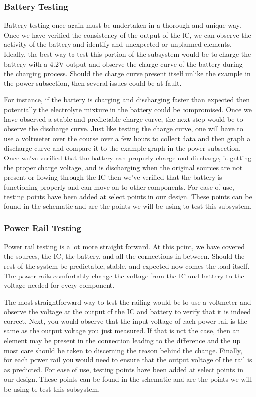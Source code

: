 \subsubsection{Battery Testing}
Battery testing once again must be undertaken in a thorough and unique way. Once we have verified the consistency of the output of the IC, we can observe the activity of the battery and identify and unexpected or unplanned elements. Ideally, the best way to test this portion of the subsystem would be to charge the battery with a 4.2V output and observe the charge curve of the battery during the charging process. Should the charge curve present itself unlike the example in the power subsection, then several issues could be at fault. 

For instance, if the battery is charging and discharging faster than expected then potentially the electrolyte mixture in the battery could be compromised. Once we have observed a stable and predictable charge curve, the next step would be to observe the discharge curve. Just like testing the charge curve, one will have to use a voltmeter over the course over a few hours to collect data and then graph a discharge curve and compare it to the example graph in the power subsection. Once we've verified that the battery can properly charge and discharge, is getting the proper charge voltage, and is discharging when the original sources are not present or flowing through the IC then we've verified that the battery is functioning properly and can move on to other components. For ease of use, testing points have been added at select points in our design. These points can be found in the schematic and are the points we will be using to test this subsystem.

\subsubsection{Power Rail Testing}
Power rail testing is a lot more straight forward. At this point, we have covered the sources, the IC, the battery, and all the connections in between. Should the rest of the system be predictable, stable, and expected now comes the load itself. The power rails comfortably change the voltage from the IC and battery to the voltage needed for every component. 

The most straightforward way to test the railing would be to use a voltmeter and observe the voltage at the output of the IC and battery to verify that it is indeed correct.
Next, you would observe that the input voltage of each power rail is the same as the output voltage you just measured. If that is not the case, then an element may be present in the connection leading to the difference and the up most care should be taken to discerning the reason behind the change. Finally, for each power rail you would need to ensure that the output voltage of the rail is as predicted. For ease of use, testing points have been added at select points in our design. These points can be found in the schematic and are the points we will be using to test this subsystem.
